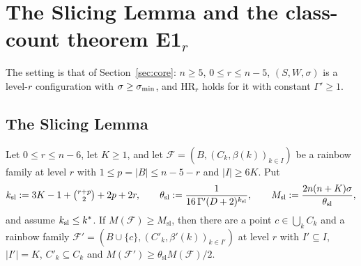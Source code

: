 \section{The Slicing Lemma and the class-count theorem E1$_r$}\label{sec:slicing}

The setting is that of Section~\ref{sec:core}: $n\ge5$, $0\le r\le n-5$, $(S,W,\sigma)$ is a level-$r$ configuration with
$\sigma\ge\sigma_{\min}$, and HR$_r$ holds for it with constant $\Gamma'\ge1$.

\subsection{The Slicing Lemma}

\begin{lemma}\label{lem:slicing}
Let $0\le r\le n-6$, let $K\ge1$, and let $\mathcal F=(B,(C_k,\beta(k))_{k\in I})$ be a rainbow family at level $r$
with $1\le p=|B|\le n-5-r$ and $|I|\ge6K$. Put
\[
k_{\mathrm{sl}}:=3K-1+\tbinom{r+p}2+2p+2r,\qquad\theta_{\mathrm{sl}}:=\frac1{16\,\Gamma'(D+2)^{k_{\mathrm{sl}}}},\qquad
M_{\mathrm{sl}}:=\frac{2n(n+K)\sigma}{\theta_{\mathrm{sl}}},
\]
and assume $k_{\mathrm{sl}}\le k^{\ast}$. If $M(\mathcal F)\ge M_{\mathrm{sl}}$, then there are a point $c\in\bigcup_kC_k$ and a rainbow family
$\mathcal F'=(B\cup\{c\},(C'_k,\beta'(k))_{k\in I'})$ at level $r$ with $I'\subseteq I$, $|I'|=K$, $C'_k\subseteq C_k$ and
$M(\mathcal F')\ge\theta_{\mathrm{sl}}M(\mathcal F)/2$.
\end{lemma}


